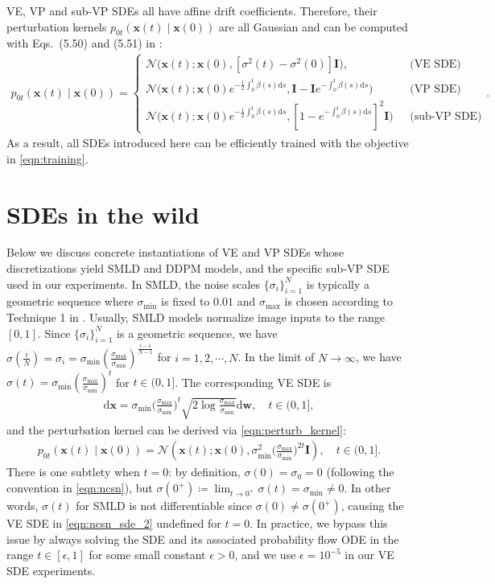 \documentclass{article} \usepackage{iclr2021_conference,times}
\newcommand{\ud}{\mathrm{d}}
\newcommand{\mcal}{\mathcal}
\newcommand{\bfx}{\mathbf{x}}
\newcommand{\bfw}{\mathbf{w}}
\newcommand{\bfI}{\mathbf{I}}
\newcommand{\sm}{\sigma_{\text{min}}}
\newcommand{\sM}{\sigma_{\text{max}}}
\begin{document}
VE, VP and sub-VP SDEs all have affine drift coefficients. Therefore, their perturbation kernels $p_{0t}(\bfx(t) \mid \bfx(0))$ are all Gaussian and can be computed with Eqs.~(5.50) and (5.51) in \citet{sarkka2019applied}:
\begin{align}
    p_{0t}(\bfx(t) \mid \bfx(0)) = \begin{cases} 
    \mcal{N}\big(\bfx(t) ; \bfx(0), [\sigma^2(t) - \sigma^2(0)] \bfI\big), &~~~ \text{(VE SDE)}\\
    \mcal{N}\big(\bfx(t) ; \bfx(0)e^{-\frac{1}{2}\int_0^t \beta(s) \ud s}, \bfI - \bfI e^{-\int_0^t \beta(s) \ud s}\big) &~~~ \text{(VP SDE)}\\
    \mcal{N}\big(\bfx(t) ; \bfx(0)e^{-\frac{1}{2}\int_0^t \beta(s) \ud s}, [1 - e^{-\int_0^t \beta(s) \ud s}]^2 \bfI\big) &~~~ \text{(sub-VP SDE)}
    \end{cases}.\label{eqn:perturb_kernel}
\end{align}
As a result, all SDEs introduced here can be efficiently trained with the objective in \cref{eqn:training}.

\section{SDEs in the wild} \label{app:wild_sde}
Below we discuss concrete instantiations of VE and VP SDEs whose discretizations yield SMLD and DDPM models, and the specific sub-VP SDE used in our experiments. In SMLD, the noise scales $\{\sigma_i\}_{i=1}^N$ is typically a geometric sequence where $\sigma_\text{min}$ is fixed to $0.01$ and $\sigma_\text{max}$ is chosen according to Technique 1 in \citet{song2020improved}. Usually, SMLD models normalize image inputs to the range $[0, 1]$. Since $\{\sigma_i\}_{i=1}^N$ is a geometric sequence, we have $\sigma(\frac{i}{N}) = \sigma_i = \sm \left(\frac{\sM}{\sm}\right)^{\frac{i-1}{N-1}}$ for $i=1,2,\cdots, N$. In the limit of $N \to \infty$, we have $\sigma(t) = \sm \left(\frac{\sM}{\sm}\right)^{t}$ for $t \in (0, 1]$. The corresponding VE SDE is
\begin{align}
\ud \bfx = \sm \bigg( \frac{\sM}{\sm} \bigg)^t \sqrt{2 \log \frac{\sM}{\sm}}\ud \bfw, \quad t \in (0, 1],
\end{align}
and the perturbation kernel can be derived via \cref{eqn:perturb_kernel}:
\begin{align}
    p_{0t}(\bfx(t) \mid \bfx(0)) = \mcal{N}\left(\bfx(t) ; \bfx(0), \sm^2 \Big( \frac{\sM}{\sm}\Big)^{2t} \bfI\right), \quad t \in (0, 1].
\end{align}
There is one subtlety when $t=0$: by definition, $\sigma(0) = \sigma_0 = 0$ (following the convention in \cref{eqn:ncsn}), but $\sigma(0^+) \coloneqq \lim_{t \to 0^+} \sigma(t) = \sigma_\text{min} \neq 0$. In other words, $\sigma(t)$ for SMLD is not differentiable since $\sigma(0) \neq \sigma(0^+)$, causing the VE SDE in \cref{eqn:ncsn_sde_2} undefined for $t=0$. In practice, we bypass this issue by always solving the SDE and its associated probability flow ODE in the range $t \in [\epsilon, 1]$ for some small constant $\epsilon > 0$, and we use $\epsilon = 10^{-5}$ in our VE SDE experiments. 
\end{document}
